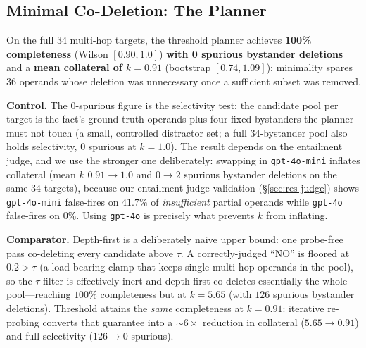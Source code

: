 \documentclass[10pt,twocolumn,letterpaper]{article}
\theoremstyle{definition}
\theoremstyle{plain}
\newcommand{\code}[1]{\texttt{#1}}
\begin{document}
\subsection{Minimal Co-Deletion: The Planner}\label{sec:res-planner}

On the full 34 multi-hop targets, the threshold planner achieves \textbf{100\%
completeness} (Wilson $[0.90,1.0]$) \textbf{with 0 spurious bystander deletions} and
a \textbf{mean collateral of $k=0.91$} (bootstrap $[0.74,1.09]$); minimality spares
36 operands whose deletion was unnecessary once a sufficient subset was removed.

\textbf{Control.} The 0-spurious figure is the selectivity test: the candidate pool
per target is the fact's ground-truth operands plus four fixed bystanders the
planner must not touch (a small, controlled distractor set; a full $34$-bystander
pool also holds selectivity, $0$ spurious at $k{=}1.0$). The result
depends on the entailment judge, and we use the stronger one deliberately: swapping
in \code{gpt-4o-mini} inflates collateral (mean $k$ $0.91{\to}1.0$ and $0{\to}2$
spurious bystander deletions on the same $34$ targets), because our entailment-judge
validation (\S\ref{sec:res-judge}) shows \code{gpt-4o-mini} false-fires on $41.7\%$
of \emph{insufficient} partial operands while \code{gpt-4o} false-fires on $0\%$.
Using \code{gpt-4o} is precisely what prevents $k$ from inflating.

\textbf{Comparator.} Depth-first is a deliberately naive upper bound: one
probe-free pass co-deleting every candidate above $\tau$. A correctly-judged
``NO'' is floored at $0.2>\tau$ (a load-bearing clamp that keeps single multi-hop
operands in the pool), so the $\tau$ filter is effectively inert and depth-first
co-deletes essentially the whole pool---reaching $100\%$ completeness but at
$k=5.65$ (with $126$ spurious bystander deletions). Threshold attains
the \emph{same} completeness at $k=0.91$: iterative re-probing converts that
guarantee into a $\sim6\times$ reduction in collateral ($5.65\to0.91$) and full
selectivity ($126\to 0$ spurious).
\end{document}
